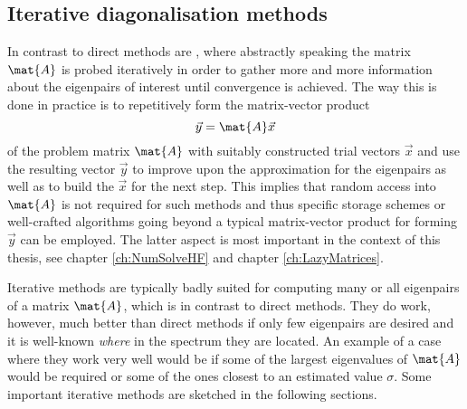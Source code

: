 \subsection{Iterative diagonalisation methods}
In contrast to direct methods are ,
where abstractly speaking the matrix $\mat{A}$ is probed iteratively
in order to gather more and more information
about the eigenpairs of interest until convergence is achieved.
The way this is done in practice is to repetitively form
the matrix-vector product
\[ \vec{y} = \mat{A}\vec{x} \]
of the problem matrix $\mat{A}$
with suitably constructed trial vectors $\vec{x}$
and use the resulting vector $\vec{y}$
to improve upon the approximation for the eigenpairs as well as to
build the $\vec{x}$ for the next step.
This implies that random access into $\mat{A}$
is not required for such methods and thus specific storage schemes
or well-crafted algorithms going beyond a typical matrix-vector product
for forming $\vec{y}$ can be employed.
The latter aspect is most important in the context of this thesis,
see chapter \vref{ch:NumSolveHF} and chapter \vref{ch:LazyMatrices}.

Iterative methods are typically badly suited for
computing many or all eigenpairs of a matrix $\mat{A}$,
which is in contrast to direct methods.
They do work, however, much better than direct methods
if only few eigenpairs are desired
and it is well-known \emph{where} in the spectrum they are located.
An example of a case where they work very well
would be if some of the largest eigenvalues of $\mat{A}$ would be required
or some of the ones closest to an estimated value $\sigma$.
Some important iterative methods are sketched in the following sections.

